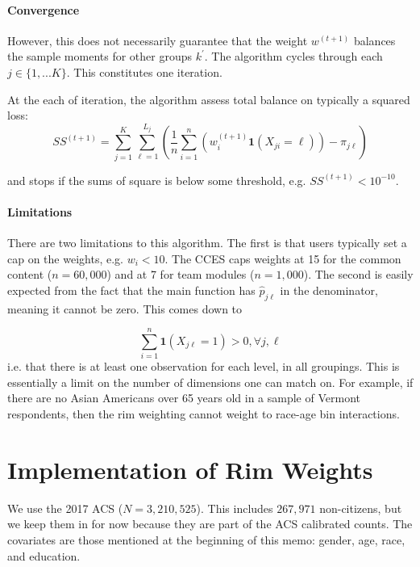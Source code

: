\documentclass[11pt]{article}
\begin{document}
\paragraph{Convergence}
However, this does not necessarily guarantee that the weight \(w^{(t+1)}\) balances the sample moments for other groups \(k^{\prime}\). The algorithm cycles through each \(j \in \{1, ... K\}\). This constitutes one iteration.

At the each of iteration, the algorithm assess total balance on typically a  squared loss:
\[SS^{(t+1)} = \sum^K_{j=1}\sum^{L_{j}}_{\ell = 1}\left(\frac{1}{n}\sum^n_{i=1}(w_i^{(t+1)}\mathbf{1}(X_{ji} = \ell)) - \pi_{j\ell}\right)\]

and stops if the sums of square is below some threshold, e.g. \(SS^{(t+1)} < 10^{-10}.\)


\paragraph{Limitations}
There are two limitations to this algorithm. The first is that users typically set a cap on the weights, e.g. \(w_{i} < 10\). The CCES caps weights at 15 for the common content (\(n = 60,000\)) and at 7 for team modules (\(n = 1,000\)). The second is easily expected from the fact that the main function has \(\widehat{p}_{j\ell}\) in the denominator, meaning it cannot be zero. This comes down to 

\[\sum^n_{i=1}\mathbf{1}(X_{j\ell} = 1) > 0, \forall j, \ell\]
i.e. that there is at least one observation for each level, in all groupings. This is essentially a limit on the number of dimensions one can match on. For example, if there are no Asian Americans over 65 years old in a sample of Vermont respondents, then the rim weighting cannot weight to race-age bin interactions.

\section{Implementation of Rim Weights}

We use the 2017 ACS (\(N = 3,210,525\)). This includes \(267,971\) non-citizens, but we keep them in for now because they are part of the ACS calibrated counts. The covariates are those mentioned at the beginning of this memo: gender, age, race, and education.
\end{document}
